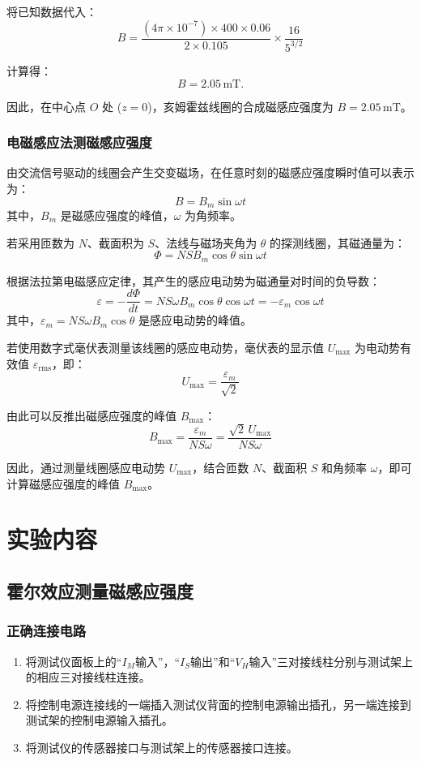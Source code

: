 \documentclass[UTF-8,twoside,cs4size]{ctexart}
\begin{document}
将已知数据代入：
\[
B = \frac{(4 \pi \times 10^{-7}) \times 400 \times 0.06}{2 \times 0.105} \times \frac{16}{5^{3/2}}
\]

计算得：
\[
B = 2.05 \, \mathrm{mT}.
\]

因此，在中心点 $O$ 处 ($z = 0$)，亥姆霍兹线圈的合成磁感应强度为 $B = 2.05 \, \mathrm{mT}$。

\subsubsection{电磁感应法测磁感应强度}
由交流信号驱动的线圈会产生交变磁场，在任意时刻的磁感应强度瞬时值可以表示为：
\[
B = B_m \sin \omega t
\]
其中，$B_m$ 是磁感应强度的峰值，$\omega$ 为角频率。\par

若采用匝数为 $N$、截面积为 $S$、法线与磁场夹角为 $\theta$ 的探测线圈，其磁通量为：
\[
\Phi = N S B_m \cos \theta \sin \omega t
\]

根据法拉第电磁感应定律，其产生的感应电动势为磁通量对时间的负导数：
\[
\varepsilon = -\frac{d\Phi}{dt} = N S \omega B_m \cos \theta \cos \omega t = -\varepsilon_m \cos \omega t
\]
其中，$\varepsilon_m = N S \omega B_m \cos \theta$ 是感应电动势的峰值。\par

若使用数字式毫伏表测量该线圈的感应电动势，毫伏表的显示值 $U_{\max}$ 为电动势有效值 $\varepsilon_{\mathrm{rms}}$，即：
\[
U_{\max} = \frac{\varepsilon_m}{\sqrt{2}}
\]

由此可以反推出磁感应强度的峰值 $B_{\max}$：
\[
B_{\max} = \frac{\varepsilon_m}{N S \omega} = \frac{\sqrt{2} \, U_{\max}}{N S \omega}
\]

因此，通过测量线圈感应电动势 $U_{\max}$，结合匝数 $N$、截面积 $S$ 和角频率 $\omega$，即可计算磁感应强度的峰值 $B_{\max}$。

\section{实验内容}
\subsection{霍尔效应测量磁感应强度}
\subsubsection{正确连接电路}
\begin{enumerate}
    \item 将测试仪面板上的“$I_M$输入”，“$I_S$输出”和“$V_H$输入”三对接线柱分别与测试架上的相应三对接线柱连接。\par
    \item 将控制电源连接线的一端插入测试仪背面的控制电源输出插孔，另一端连接到测试架的控制电源输入插孔。\par
    \item 将测试仪的传感器接口与测试架上的传感器接口连接。\par
\end{enumerate}
\end{document}
